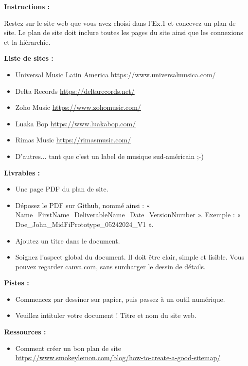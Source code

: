 \makeheaderfiles

\textbf{Instructions :}

Restez sur le site web que vous avez choisi dans l'Ex.1 et concevez un plan de site. Le plan de site doit inclure toutes les pages du site ainsi que les connexions et la hiérarchie.

\textbf{Liste de sites :}

\begin{itemize}
\item Universal Music Latin America \url{https://www.universalmusica.com/}
\item Delta Records \url{https://deltarecords.net/}
\item Zoho Music \url{https://www.zohomusic.com/}
\item Luaka Bop \url{https://www.luakabop.com/}
\item Rimas Music \url{https://rimasmusic.com/}
\item D'autres... tant que c'est un label de musique sud-américain ;-)
\end{itemize}

\textbf{Livrables :}

\begin{itemize}
\item Une page PDF du plan de site.
\item Déposez le PDF sur Github, nommé ainsi : « Name\_FirstName\_DeliverableName\_Date\_VersionNumber ». Exemple : « Doe\_John\_MidFiPrototype\_05242024\_V1 ».
\item Ajoutez un titre dans le document.
\item Soignez l'aspect global du document. Il doit être clair, simple et lisible. Vous pouvez regarder canva.com, sans surcharger le dessin de détails.
\end{itemize}

\textbf{Pistes :}

\begin{itemize}
\item Commencez par dessiner sur papier, puis passez à un outil numérique.
\item Veuillez intituler votre document ! Titre et nom du site web.
\end{itemize}

\textbf{Ressources :}

\begin{itemize}
\item Comment créer un bon plan de site \url{https://www.smokeylemon.com/blog/how-to-create-a-good-sitemap/}
\end{itemize}

